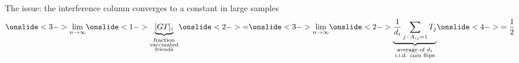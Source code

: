\documentclass[aspectratio=169]{beamer}
\theoremstyle{remark}
\begin{document}
\begin{frame}{The issue: the interference column converges to a constant in large samples}
    \centering
    \Large
    \vspace{6mm}
    \begin{equation*}
        \onslide<3->{
            \lim_{n \to \infty}
        }
        \onslide<1->{
            \underbrace{[GT]_i}_{\substack{\text{fraction} \\ \text{vaccinated} \\ \text{friends}}}
        }
        \onslide<2->{=}
        \onslide<3->{
            \lim_{n \to \infty}
        }
        \onslide<2->{
            \underbrace{
                \frac{1}{d_i} \sum_{j \, : \, A_{ij} = 1} T_j
            }_{\substack{\text{average of $d_i$}           \\ \text{i.i.d. coin flips}}}
        }
        \onslide<4->{
            = \frac 12   
        }
    \end{equation*} \\
    \normalsize
    \vspace{6mm}
\end{frame}
\end{document}
